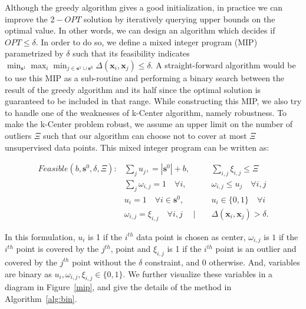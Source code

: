 \documentclass{article} \usepackage{iclr2018_conference,times}
\begin{document}
Although the greedy algorithm gives a good initialization, in practice we can improve the $2-OPT$ solution by
iteratively querying upper bounds on the optimal value. In other words, we can design an algorithm which decides if $OPT
\leq \delta$. In order to do so, we define a mixed integer program (MIP) parametrized by $\delta$ such that its
feasibility indicates $\min_{\mathbf{s}^1} \max_i \min_{j \in \mathbf{s}^1 \cup \mathbf{s}^0}
\Delta(\mathbf{x}_i,\mathbf{x}_j) \leq \delta$. A straight-forward algorithm would be to use this MIP as a sub-routine and
performing a binary search between the result of the greedy algorithm and its half since the optimal solution is
guaranteed to be included in that range. While constructing this MIP, we also try to handle one of the weaknesses of
k-Center algorithm, namely robustness. To make the k-Center problem robust, we assume an upper limit on the number of
outliers $\Xi$ such that our algorithm can choose not to cover at most $\Xi$ unsupervised data points. This mixed
integer program can be written as:


\begin{equation} 
\begin{aligned}
Feasible(b,\mathbf{s}^0,\delta, \Xi):  &\sum_j  u_j, = |\mathbf{s}^0|+ b,  \quad &&  \sum_{i,j} \xi_{i,j} \leq \Xi \\
&\sum_j \omega_{i,j} = 1\quad \forall  i, \quad && \omega_{i,j} \leq u_j \quad \forall  i,j \\
   & u_i =1 \quad \forall i\in \mathbf{s}^0, \quad &&u_i \in \{0, 1\} \quad \forall i \\
   &\omega_{i,j} = \xi_{i,j} \quad  \forall i,j  \quad \mid&&    \Delta(\mathbf{x}_i,\mathbf{x}_j)  > \delta .
\end{aligned}
\label{eqmip}
\end{equation}

In this formulation, $u_i$ is 1 if the $i^{th}$ data point is chosen as center, $\omega_{i,j}$ is $1$ if the $i^{th}$
point is covered by the $j^{th}$, point and $\xi_{i,j}$ is 1 if the $i^{th}$ point is an outlier and covered by the
$j^{th}$ point without the $\delta$ constraint, and $0$ otherwise. And, variables are binary as $u_i, \omega_{i,j},
\xi_{i,j} \in \{0,1\}$. We further visualize these variables in a diagram in Figure~\ref{mip}, and give the details of
the method in Algorithm~\ref{alg:bin}. 
\end{document}
